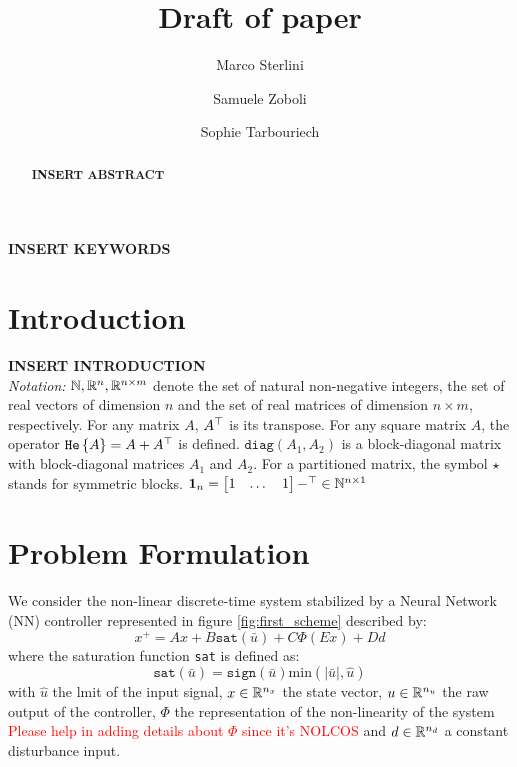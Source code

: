 \documentclass{ifacconf}
\theoremstyle{plain}
\begin{document}
\begin{frontmatter}

\title{Draft of paper}

\author[First]{Marco Sterlini}
\author[Second]{Samuele Zoboli}
\author[Second]{Sophie Tarbouriech}

\address[First]{Università di Trento, Trento, Italy (e-mail: marco.sterlini@studenti.unitn.it) }
\address[Second]{LAAS-CNRS, Université de Toulouse, CNRS, Toulouse, France (e-mail:bu) }


\begin{abstract}
\textbf{INSERT ABSTRACT}
\end{abstract}

\begin{keyword}
\textbf{INSERT KEYWORDS}
\end{keyword}

\end{frontmatter}

\section{Introduction}
\textbf{INSERT INTRODUCTION}\\
\emph{Notation:} ${\mathbb{N}}, {\mathbb{R}}^{n}, {\mathbb{R}}^{n \times m}$ denote the set of natural non-negative integers, the set of real vectors of dimension $n$ and the set of real matrices of dimension $n \times m$, respectively. For any matrix $A$, $A^\top$ is its transpose. For any square matrix $A$, the operator $\texttt{\relax{He}}\left\{{ A }\right\} = A + A^\top$ is defined. $\texttt{diag}(A_1, A_2)$ is a block-diagonal matrix with block-diagonal matrices $A_1$ and $A_2$. For a partitioned matrix, the symbol $\star$ stands for symmetric blocks. $\operatorname{\mathbf{1}}_n = \left[\begin{matrix}1 & \dots & 1\end{matrix}\right]-^\top \in {\mathbb{N}}^{n \times 1}$

\section{Problem Formulation}
We consider the non-linear discrete-time system stabilized by a Neural Network (NN) controller represented in figure \ref{fig:first_scheme} described by:
\begin{equation}
  x^{+} = A x + B \texttt{sat}(\bar{u}) + C \Phi(E x) + D d 
\end{equation}
where the saturation function \texttt{sat} is defined as:
$$
    \texttt{sat}(\bar{u}) = \texttt{sign}(\bar{u})\text{min}(|\bar{u}|, \hat{u})
$$
with $\hat{u}$ the lmit of the input signal, $x \in {\mathbb{R}}^{n_x}$ the state vector, $\relax{u} \in {\mathbb{R}}^{n_u}$ the raw output of the controller, $\Phi$ the representation of the non-linearity of the system \textcolor{red}{Please help in adding details about $\Phi$ since it's NOLCOS} and $d \in {\mathbb{R}}^{n_d}$ a constant disturbance input.
\end{document}
